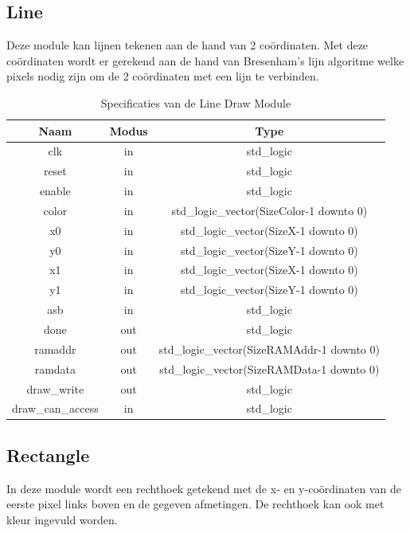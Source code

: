 \documentclass{scrreprt} %
\begin{document}
\subsection {Line}
Deze module kan lijnen tekenen aan de hand van 2 coördinaten. Met deze coördinaten wordt er gerekend aan de hand van Bresenham's lijn algoritme welke pixels nodig zijn om de 2 coördinaten met een lijn te verbinden.

\begin{table}[H]
\centering
\caption{Specificaties van de Line Draw Module}
\label{tab:spec-line-draw}
\begin{tabular}{c c c}
	\hline\hline
 	Naam & Modus & Type\\
 	\hline	
	clk & in & std\_logic \\
	reset & in & std\_logic \\
	enable& in & std\_logic \\
	color & in & std\_logic\_vector(SizeColor-1 downto 0) \\
	x0 & in & std\_logic\_vector(SizeX-1 downto 0) \\
	y0 & in & std\_logic\_vector(SizeY-1 downto 0) \\
	x1 & in & std\_logic\_vector(SizeX-1 downto 0) \\
	y1 & in & std\_logic\_vector(SizeY-1 downto 0) \\
	asb & in & std\_logic \\
	done & out & std\_logic \\
	ramaddr &out & std\_logic\_vector(SizeRAMAddr-1 downto 0) \\
	ramdata &out & std\_logic\_vector(SizeRAMData-1 downto 0) \\
	draw\_write &out & std\_logic \\
	draw\_can\_access & in & std\_logic \\
  	\hline
\end{tabular}
\end{table}

\subsection {Rectangle}
In deze module wordt een rechthoek getekend met de x- en y-coördinaten van de eerste pixel links boven en de gegeven afmetingen. De rechthoek kan ook met kleur ingevuld worden. 
\end{document}
